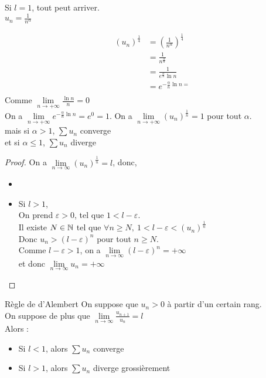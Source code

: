 \documentclass[../main.tex]{subfile}
\begin{document}
\begin{rema}
	Si $l=1$, tout peut arriver.\\
	$u_n = \frac{1}{n^\alpha}$

$$
\begin{aligned}
	(u_n)^{\frac{1}{4}} &= (\frac{1}{n^\alpha})^{\frac{1}{4}}\\
	&= \frac{1}{n^{\frac{\alpha}{n}}}\\
	&= \frac{1}{e^{\frac{\alpha}{n}}\ln n}\\
	&= e^{-\frac{\alpha}{n}\ln n=}\\
\end{aligned}
$$
Comme $\lim\limits_{n \to +\infty} \frac{\ln n}{n} = 0$\\
On a $\lim\limits_{n \to +\infty} e^{-\frac{\alpha}{n}\ln n} = e^0 = 1$.
On a $\lim\limits_{n \to +\infty} (u_n)^{\frac{1}{n}} = 1$ pour tout $\alpha$.\\
mais si $\alpha > 1$, $\sum u_n$ converge\\
et si $\alpha \leq 1$, $\sum u_n$ diverge\\

\begin{proof}
	On a $\lim\limits_{n \to \infty} (u_n)^{\frac{1}{n}} = l$, donc, \\
\begin{itemize}	
	\item 
	\item Si $l > 1$, \\
	On prend $\varepsilon > 0$, tel que $1 < l - \varepsilon$.\\
	Il existe $N \in \mathbb{N}$ tel que $\forall n \geq N, \ 1 < l - \varepsilon <  (u_n)^{\frac{1}{n}}$\\
	Donc $u_n > (l - \varepsilon)^n$ pour tout $n \geq N$.\\
	Comme $l - \varepsilon > 1$, on a $\lim\limits_{n \to \infty} (l - \varepsilon)^n = +\infty$\\
	et donc $\lim\limits_{n \to \infty} u_n = + \infty$
\end{itemize}
\end{proof}
\end{rema}

\begin{theo}{Règle de d'Alembert}
	On suppose que $u_n > 0$ à partir d'un certain rang.\\
	On suppose de plus que $\lim\limits_{n \to \infty} \frac{u_{n+1}}{u_n} = l$\\
	Alors : 
\begin{itemize}	
	\item Si $l < 1$, alors $\sum u_n$ converge
	\item Si $l > 1$, alors $\sum u_n$ diverge grossièrement
\end{itemize}
\end{theo}
\end{document}
